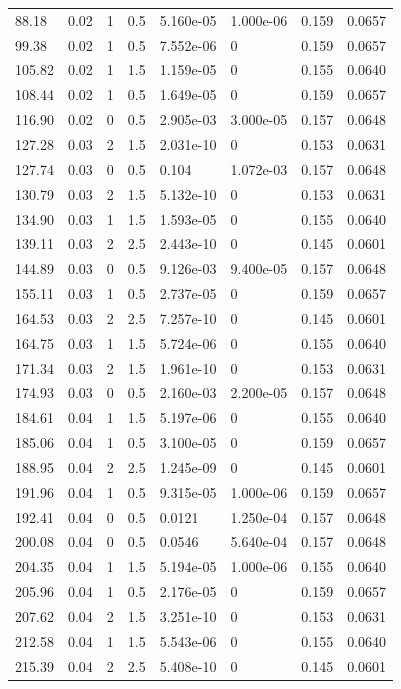 \documentclass[preview]{standalone}
\begin{document}
{{\begin{tabular}{L{1.2cm}C{1.2cm} C{0.3cm}C{0.5cm} C{1.4cm}C{1.4cm} C{1.4cm}C{1.4cm}}
  88.18  &  0.02  & 1     & 0.5 &  5.160e-05  & 1.000e-06  & 0.159 &  0.0657   \\ 
  99.38  &  0.02  & 1     & 0.5 &  7.552e-06  & 0  & 0.159 &  0.0657   \\ 
  105.82  &  0.02  & 1     & 1.5 &  1.159e-05  & 0  & 0.155 &  0.0640   \\ 
  108.44  &  0.02  & 1     & 0.5 &  1.649e-05  & 0  & 0.159 &  0.0657   \\ 
  116.90  &  0.02  & 0     & 0.5 &  2.905e-03  & 3.000e-05  & 0.157 &  0.0648   \\ 
  127.28  &  0.03  & 2     & 1.5 &  2.031e-10  & 0  & 0.153 &  0.0631   \\ 
  127.74  &  0.03  & 0     & 0.5 &  0.104  & 1.072e-03  & 0.157 &  0.0648   \\ 
  130.79  &  0.03  & 2     & 1.5 &  5.132e-10  & 0  & 0.153 &  0.0631   \\ 
  134.90  &  0.03  & 1     & 1.5 &  1.593e-05  & 0  & 0.155 &  0.0640   \\ 
  139.11  &  0.03  & 2     & 2.5 &  2.443e-10  & 0  & 0.145 &  0.0601   \\ 
  144.89  &  0.03  & 0     & 0.5 &  9.126e-03  & 9.400e-05  & 0.157 &  0.0648   \\ 
  155.11  &  0.03  & 1     & 0.5 &  2.737e-05  & 0  & 0.159 &  0.0657   \\ 
  164.53  &  0.03  & 2     & 2.5 &  7.257e-10  & 0  & 0.145 &  0.0601   \\ 
  164.75  &  0.03  & 1     & 1.5 &  5.724e-06  & 0  & 0.155 &  0.0640   \\ 
  171.34  &  0.03  & 2     & 1.5 &  1.961e-10  & 0  & 0.153 &  0.0631   \\ 
  174.93  &  0.03  & 0     & 0.5 &  2.160e-03  & 2.200e-05  & 0.157 &  0.0648   \\ 
  184.61  &  0.04  & 1     & 1.5 &  5.197e-06  & 0  & 0.155 &  0.0640   \\ 
  185.06  &  0.04  & 1     & 0.5 &  3.100e-05  & 0  & 0.159 &  0.0657   \\ 
  188.95  &  0.04  & 2     & 2.5 &  1.245e-09  & 0  & 0.145 &  0.0601   \\ 
  191.96  &  0.04  & 1     & 0.5 &  9.315e-05  & 1.000e-06  & 0.159 &  0.0657   \\ 
  192.41  &  0.04  & 0     & 0.5 &  0.0121  & 1.250e-04  & 0.157 &  0.0648   \\ 
  200.08  &  0.04  & 0     & 0.5 &  0.0546  & 5.640e-04  & 0.157 &  0.0648   \\ 
  204.35  &  0.04  & 1     & 1.5 &  5.194e-05  & 1.000e-06  & 0.155 &  0.0640   \\ 
  205.96  &  0.04  & 1     & 0.5 &  2.176e-05  & 0  & 0.159 &  0.0657   \\ 
  207.62  &  0.04  & 2     & 1.5 &  3.251e-10  & 0  & 0.153 &  0.0631   \\ 
  212.58  &  0.04  & 1     & 1.5 &  5.543e-06  & 0  & 0.155 &  0.0640   \\ 
  215.39  &  0.04  & 2     & 2.5 &  5.408e-10  & 0  & 0.145 &  0.0601   \\ 
\hline 
\end{tabular} 

}}
\end{document}
